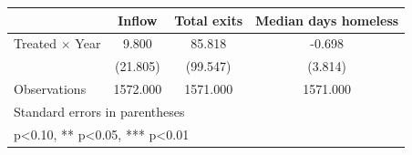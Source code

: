 {
\def\sym#1{\ifmmode^{#1}\else\(^{#1}\)\fi}
\begin{tabular}{l*{3}{c}}
\toprule
            &\multicolumn{1}{c}{Inflow}&\multicolumn{1}{c}{Total exits}&\multicolumn{1}{c}{Median days homeless}\\
\midrule
Treated $\times$ Year&       9.800   &      85.818   &      -0.698   \\
            &    (21.805)   &    (99.547)   &     (3.814)   \\
\midrule
Observations&    1572.000   &    1571.000   &    1571.000   \\
\bottomrule
\multicolumn{4}{l}{\footnotesize Standard errors in parentheses}\\
\multicolumn{4}{l}{\footnotesize * p<0.10, ** p<0.05, *** p<0.01}\\
\end{tabular}
}
